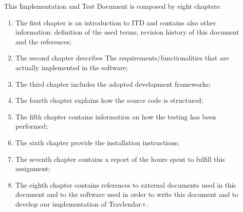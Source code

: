 This Implementation and Test Document is composed by eight chapters:
\begin{enumerate}
	\item The first chapter is an introduction to ITD and contains also other information: definition of the used terms, revision history of this document and the references;
	\item The second chapter describes The
requirements/functionalities that are actually implemented in the software;
	\item The third chapter includes the adopted
development frameworks;
	\item The fourth chapter explains how the source code is structured;
	\item The fifth chapter contains information
on how the testing has been performed;
	\item The sixth chapter provide the installation instructions;
	\item The seventh chapter contains a report of the hours spent to fulfill this assignment;
	\item The eighth chapter contains references to external documents used in this document and to the software used in order to write this document and to develop our implementation of Travlendar+.
\end{enumerate}
